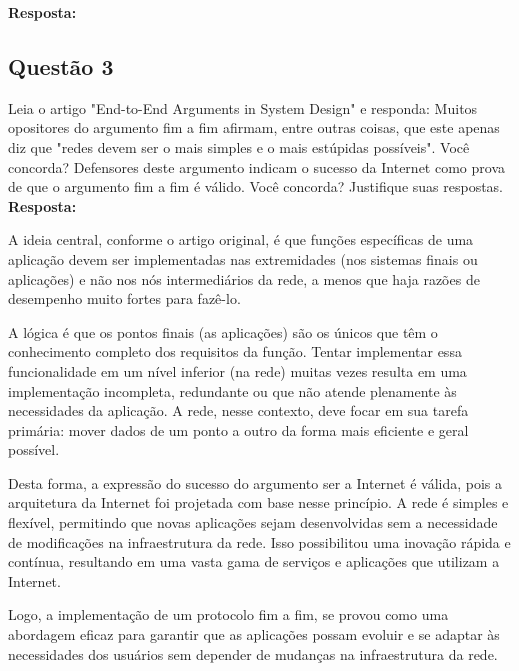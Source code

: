 \noindent
\textbf{Resposta:}


\subsection{Questão 3}
Leia o artigo "End-to-End Arguments in System Design" e responda:
Muitos opositores do argumento fim a fim afirmam, entre outras coisas, que este
apenas diz que "redes devem ser o mais simples e o mais estúpidas possíveis".
Você concorda? Defensores deste argumento indicam o sucesso da Internet como
prova de que o argumento fim a fim é válido. Você concorda? Justifique suas
respostas.\\

\noindent
\textbf{Resposta:}

A ideia central, conforme o artigo original, é que funções específicas de uma aplicação devem ser implementadas nas extremidades (nos sistemas finais ou aplicações) e não nos nós intermediários da rede, a menos que haja razões de desempenho muito fortes para fazê-lo.

A lógica é que os pontos finais (as aplicações) são os únicos que têm o conhecimento completo dos requisitos da função. Tentar implementar essa funcionalidade em um nível inferior (na rede) muitas vezes resulta em uma implementação incompleta, redundante ou que não atende plenamente às necessidades da aplicação. A rede, nesse contexto, deve focar em sua tarefa primária: mover dados de um ponto a outro da forma mais eficiente e geral possível.

Desta forma, a expressão do sucesso do argumento ser a Internet é válida, pois a arquitetura da Internet foi projetada com base nesse princípio. A rede é simples e flexível, permitindo que novas aplicações sejam desenvolvidas sem a necessidade de modificações na infraestrutura da rede. Isso possibilitou uma inovação rápida e contínua, resultando em uma vasta gama de serviços e aplicações que utilizam a Internet.

Logo, a implementação de um protocolo fim a fim, se provou como uma abordagem eficaz para garantir que as aplicações possam evoluir e se adaptar às necessidades dos usuários sem depender de mudanças na infraestrutura da rede. 